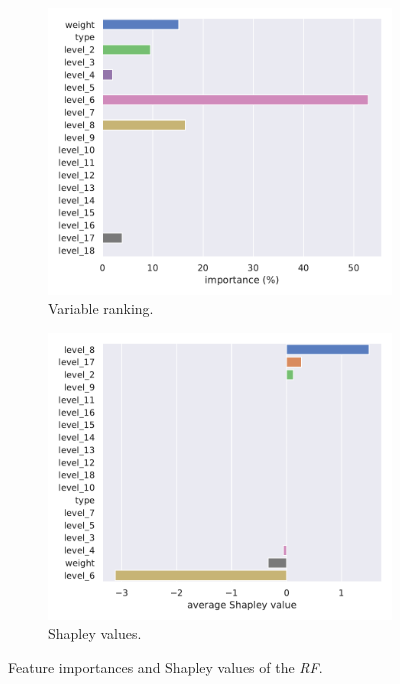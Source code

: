 \begin{figure}[htbp]
  \centering
  \begin{subfigure}{0.45\textwidth}
    \centering
    \includegraphics[width=\linewidth]{img/rnd_for_rank}
    \caption{Variable ranking.}
  \end{subfigure}
  \begin{subfigure}{0.45\textwidth}
    \centering
    \includegraphics[width=\linewidth]{img/rnd_for_shap}
    \caption{Shapley values.}
  \end{subfigure}
  \caption{Feature importances and Shapley values of the \emph{RF}.}
  \label{fig:lumps:rnd_for}
\end{figure}

